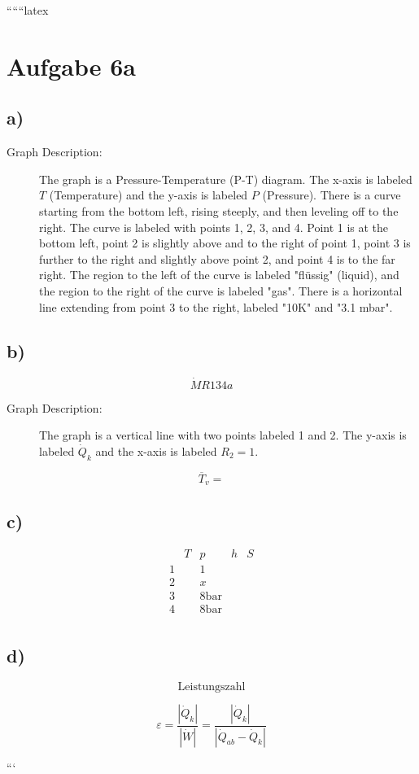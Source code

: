 
``````latex


\section*{Aufgabe 6a}

\subsection*{a)}

\begin{description}
    \item[Graph Description:] The graph is a Pressure-Temperature (P-T) diagram. The x-axis is labeled \( T \) (Temperature) and the y-axis is labeled \( P \) (Pressure). There is a curve starting from the bottom left, rising steeply, and then leveling off to the right. The curve is labeled with points 1, 2, 3, and 4. Point 1 is at the bottom left, point 2 is slightly above and to the right of point 1, point 3 is further to the right and slightly above point 2, and point 4 is to the far right. The region to the left of the curve is labeled "flüssig" (liquid), and the region to the right of the curve is labeled "gas". There is a horizontal line extending from point 3 to the right, labeled "10K" and "3.1 mbar".
\end{description}

\subsection*{b)}

\[
\dot{M} R134a
\]

\begin{description}
    \item[Graph Description:] The graph is a vertical line with two points labeled 1 and 2. The y-axis is labeled \( \dot{Q}_k \) and the x-axis is labeled \( R_2 = 1 \).
\end{description}

\[
\overline{T}_v = 
\]

\subsection*{c)}

\[
\begin{array}{c|c|c|c|c}
    & T & p & h & S \\
    \hline
    1 & & 1 & & \\
    2 & & x & & \\
    3 & & 8 \text{bar} & & \\
    4 & & 8 \text{bar} & & \\
\end{array}
\]

\subsection*{d)}

\[
\text{Leistungszahl}
\]

\[
\varepsilon = \frac{|\dot{Q}_k|}{|\dot{W}|} = \frac{|\dot{Q}_k|}{|\dot{Q}_{ab} - \dot{Q}_k|}
\]

```